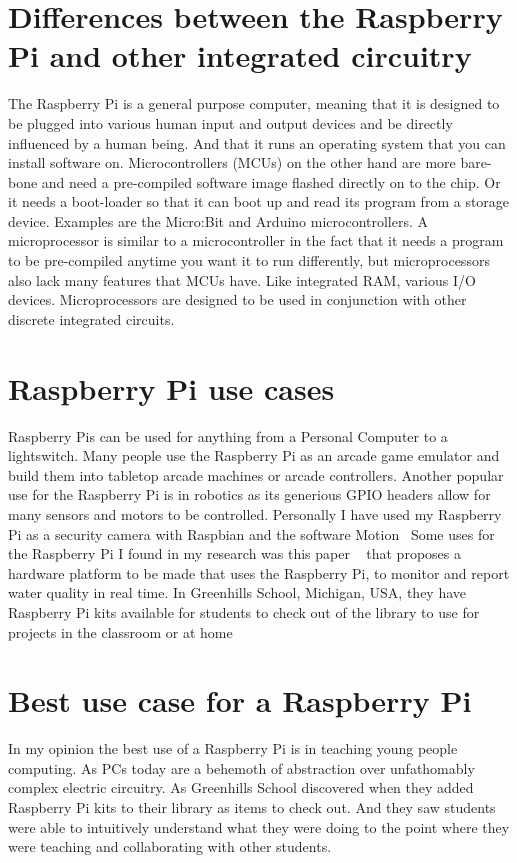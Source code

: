 \documentclass{article}
\begin{document}
    \section{Differences between the Raspberry Pi and other integrated circuitry}
    The Raspberry Pi is a general purpose computer, meaning that it is designed to be plugged into various human input and output devices and be directly influenced by a human being. 
    And that it runs an operating system that you can install software on. Microcontrollers (MCUs) on the other hand are more bare-bone and need a pre-compiled software image flashed
    directly on to the chip. Or it needs a boot-loader so that it can boot up and read its program from a storage device. Examples are the Micro:Bit and Arduino microcontrollers. 
    A microprocessor is similar to a microcontroller in the fact that it needs a program to be pre-compiled anytime you want it to run differently, but microprocessors also lack 
    many features that MCUs have. Like integrated RAM, various I/O devices. Microprocessors are designed to be used in conjunction with other discrete integrated circuits.

    \section{Raspberry Pi use cases}
    Raspberry Pis can be used for anything from a Personal Computer to a lightswitch. Many people use the Raspberry Pi as an arcade game emulator and build them into tabletop 
    arcade machines or arcade controllers. Another popular use for the Raspberry Pi is in robotics as its generious GPIO headers allow for many sensors and motors to be controlled. 
    Personally I have used my Raspberry Pi as a security camera with Raspbian and the software Motion~\cite{Motion}
    Some uses for the Raspberry Pi I found in my research was this paper ~\cite{KhatriPunit2019RPss} that proposes a hardware platform to be made that uses the Raspberry Pi, 
    to monitor and report water quality in real time. In Greenhills School, Michigan, USA, they have Raspberry Pi kits available for students to check out of the library to use for 
    projects in the classroom or at home~\cite{Toth-CherninJan2015RP}

    \section{Best use case for a Raspberry Pi}
    In my opinion the best use of a Raspberry Pi is in teaching young people computing. As PCs today are a behemoth of abstraction over unfathomably complex electric circuitry. 
    As Greenhills School discovered when they added Raspberry Pi kits to their library as items to check out. And they saw students were able to intuitively understand what 
    they were doing to the point where they were teaching and collaborating with other students. ~\cite{Toth-CherninJan2015RP}


    
    
    
\end{document}
